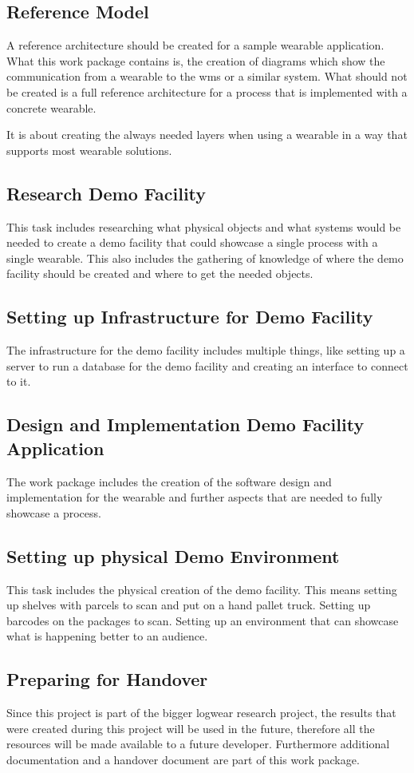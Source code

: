 \subsection{Reference Model}
A reference architecture should be created for a sample wearable application. What this work package contains is, the creation of diagrams which show the communication from a wearable to the \gls{wms} or a similar system. What should not be created is a full reference architecture for a process that is implemented with a concrete wearable. 

It is about creating the always needed layers when using a wearable in a way that supports most wearable solutions.

\subsection{Research Demo Facility}
This task includes researching what physical objects and what systems would be needed to create a demo facility that could showcase a single process with a single wearable. This also includes the gathering of knowledge of where the demo facility should be created and where to get the needed objects.

\subsection{Setting up Infrastructure for Demo Facility}
The infrastructure for the demo facility includes multiple things, like setting up a server to run a database for the demo facility and creating an interface to connect to it. 

\subsection{Design and Implementation Demo Facility Application}
The work package includes the creation of the software design and implementation for the wearable and further aspects that are needed to fully showcase a process.

\subsection{Setting up physical Demo Environment}
This task includes the physical creation of the demo facility. This means setting up shelves with \gls{parcel}s to scan and put on a hand pallet truck. Setting up barcodes on the packages to scan. Setting up an environment that can showcase what is happening better to an audience.

\subsection{Preparing for Handover}
Since this project is part of the bigger logwear research project, the results that were created during this project will be used in the future, therefore all the resources will be made available to a future developer. Furthermore additional documentation and a handover document are part of this work package.
